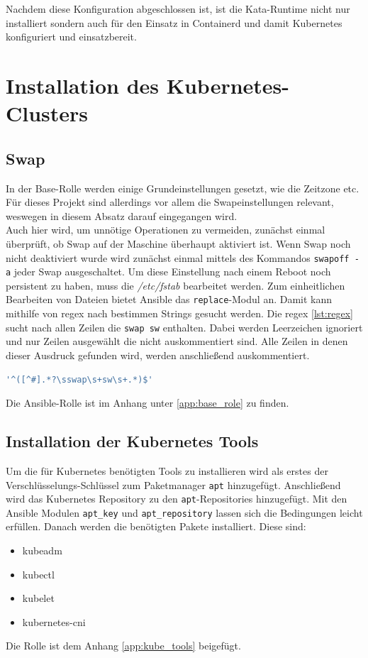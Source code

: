 Nachdem diese Konfiguration abgeschlossen ist, ist die Kata-Runtime nicht nur installiert sondern auch für den Einsatz in Containerd und damit Kubernetes konfiguriert und einsatzbereit.


\section{Installation des Kubernetes-Clusters}

\subsection{Swap}
In der Base-Rolle werden einige Grundeinstellungen gesetzt, wie die Zeitzone etc.
Für dieses Projekt sind allerdings vor allem die Swapeinstellungen relevant, weswegen in diesem Absatz darauf eingegangen wird.
\\
Auch hier wird, um unnötige Operationen zu vermeiden, zunächst einmal überprüft, ob Swap auf der Maschine überhaupt aktiviert ist.
Wenn Swap noch nicht deaktiviert wurde wird zunächst einmal mittels des Kommandos \texttt{swapoff -a} jeder Swap ausgeschaltet.
Um diese Einstellung nach einem Reboot noch persistent zu haben, muss die \textit{/etc/fstab} bearbeitet werden.
Zum einheitlichen Bearbeiten von Dateien bietet Ansible das \texttt{replace}-Modul an.
Damit kann mithilfe von \ac{regex} nach bestimmen Strings gesucht werden.
Die \ac{regex} \ref{lst:regex} sucht nach allen Zeilen die \texttt{swap sw} enthalten. 
Dabei werden Leerzeichen ignoriert und nur Zeilen ausgewählt die nicht auskommentiert sind. \cite{regex}
Alle Zeilen in denen dieser Ausdruck gefunden wird, werden anschließend auskommentiert.
\begin{lstlisting}[language=bash, caption=regex, label=lst:regex]
'^([^#].*?\sswap\s+sw\s+.*)$'
\end{lstlisting}
Die Ansible-Rolle ist im Anhang unter \ref{app:base_role} zu finden.


\subsection{Installation der Kubernetes Tools}
Um die für Kubernetes benötigten Tools zu installieren wird als erstes der Verschlüsselungs-Schlüssel zum Paketmanager \texttt{apt} hinzugefügt.
Anschließend wird das Kubernetes Repository zu den \texttt{apt}-Repositories hinzugefügt. 
Mit den Ansible Modulen \texttt{apt\_key} und \texttt{apt\_repository} lassen sich die Bedingungen leicht erfüllen.
Danach werden die benötigten Pakete installiert. 
Diese sind:
\begin{itemize}
    \item kubeadm
    \item kubectl
    \item kubelet
    \item kubernetes-cni
\end{itemize}
Die Rolle ist dem Anhang \ref{app:kube_tools} beigefügt.


